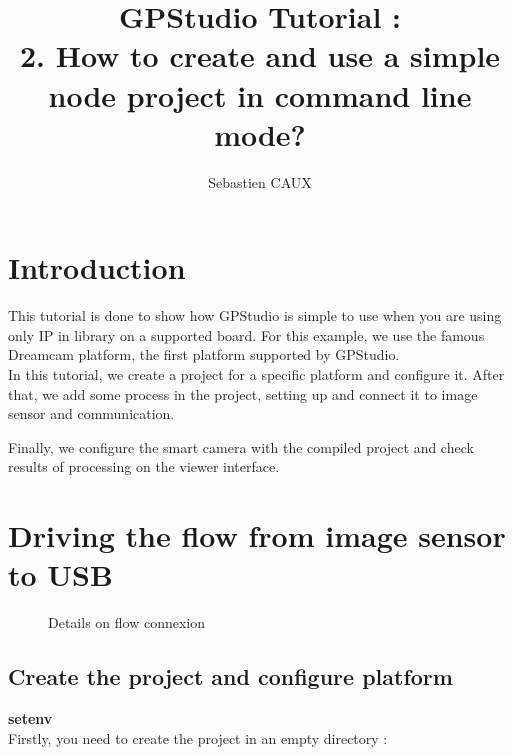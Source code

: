 \documentclass[10pt,a4paper]{article}
\author{Sebastien CAUX}
\title{GPStudio Tutorial \version : \\ 2. How to create and use a simple node project in command line mode?}
\begin{document}
\maketitle
\section{Introduction}
This tutorial is done to show how GPStudio is simple to use when you are using only IP in library on a supported board. For this example, we use the famous Dreamcam platform, the first platform supported by GPStudio.\\

In this tutorial, we create a project for a specific platform and configure it. After that, we add some process in the project, setting up and connect it to image sensor and communication.

Finally, we configure the smart camera with the compiled project and check results of processing on the viewer interface.

\section{Driving the flow from image sensor to USB}

\begin{figure}[h!]
\centering
{}
\caption{Details on flow connexion}
\end{figure}

\subsection{Create the project and configure platform}

\textbf{setenv}\\

Firstly, you need to create the project in an empty directory :
\end{document}
